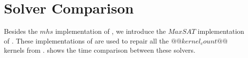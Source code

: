 \section{Solver Comparison}

Besides the $mhs$ implementation of \tool, we introduce the $MaxSAT$ implementation of \tool. These implementations of \tool are used to repair all the $@@kernel_count@@$ kernels from .  shows the time comparison between these solvers.


